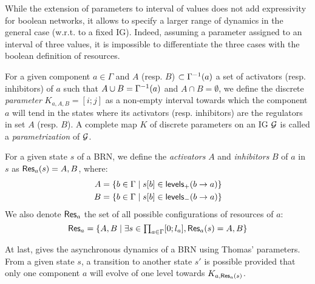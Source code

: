 While the extension of parameters to interval of values does not add expressivity for boolean
networks, it allows to specify a larger range of dynamics in the general case (w.r.t. to a fixed
IG).
Indeed, assuming a parameter assigned to an interval of three values, it is impossible to
differentiate the three cases with the boolean definition of resources.


\begin{definition}\label{def:param}
For a given component $a \in \Gamma$ and $A$ (resp. $B$) $\subset \Gamma^{-1}(a)$ a set of activators (resp. inhibitors) of $a$ such that
$A \cup B = \Gamma^{-1}(a)$ and $A \cap B = \emptyset$,
we define the discrete \emph{parameter} $K_{a,A,B} = [i; j]$ as a non-empty interval towards which the component $a$ will tend
in the states where its activators (resp. inhibitors) are the regulators in set $A$ (resp. $B$).
A complete map $K$ of discrete parameters on an IG $\mathcal{G}$ is called a \emph{parametrization} of $\mathcal{G}$.
\end{definition}

\begin{definition}\label{def:resources}
For a given state $s$ of a BRN, we define the \emph{activators} $A$ and \emph{inhibitors} $B$ of $a$ in $s$ as $\mathsf{Res}_{a}(s) = A,B$, where:
\begin{align*}
  A &= \{b \in \Gamma \mid {s[b]} \in \mathsf{levels}_+(b\rightarrow a)\} \\
  B &= \{b \in \Gamma \mid {s[b]} \in \mathsf{levels}_-(b\rightarrow a)\}
\end{align*}
We also denote $\mathsf{Res}_{a}$ the set of all possible configurations of resources of $a$:
\[\mathsf{Res}_{a} = \{A,B \mid \exists s \in \textstyle\prod_{a \in \Gamma} [0;l_a], \mathsf{Res}_{a}(s) = A,B\}\]
\end{definition}


At last,  gives the asynchronous dynamics of a BRN using Thomas' parameters.
From a given state $s$, a transition to another state $s'$ is possible provided that only one component $a$ will evolve of one level towards $K_{a,\mathsf{Res}_{a}(s)}$.

